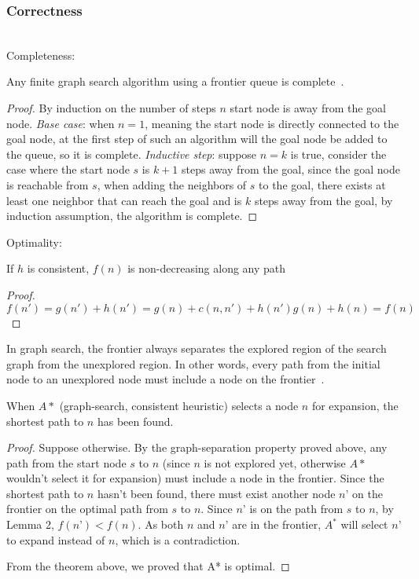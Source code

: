 \documentclass{llncs}
\begin{document}
\subsubsection{Correctness}\hfill\\
Completeness: 
\begin{lemma} 
Any finite graph search algorithm using a frontier queue is complete~\cite{ref_url1}.
\end{lemma} 
\begin{proof} 
By induction on the number of steps $n$ start node is away from the goal node. \emph{Base case}: when $n=1$, meaning the start node is directly connected to the goal node, at the first step of such an algorithm will the goal node be added to the queue, so it is complete. \emph{Inductive step}: suppose $n=k$ is true, consider the case where the start node $s$ is $k+1$ steps away from the goal, since the goal node is reachable from $s$, when adding the neighbors of $s$ to the goal, there exists at least one neighbor that can reach the goal and is $k$ steps away from the goal, by induction assumption, the algorithm is complete. 
\end{proof}
Optimality: 
\begin{lemma} 
If $h$ is consistent, $f(n)$ is non-decreasing along any path 
\end{lemma}
\begin{proof}
$f(n')=g(n')+h(n')=g(n)+c(n,n')+h(n')g(n)+h(n)=f(n)$ 
\end{proof}
\begin{lemma}  In graph search, the frontier always separates the explored region of the search graph from the unexplored region. In other words, every path from the initial node to an unexplored node must include a node on the frontier~\cite{ref_lncs1}. 
\end{lemma}
\begin{theorem} 
When $A*$ (graph-search, consistent heuristic) selects a node $n$ for expansion, the shortest path to $n$ has been found. 
\end{theorem}
\begin{proof}
Suppose otherwise. By the graph-separation property proved above, any path from the start node $s$ to $n$ (since $n$ is not explored yet, otherwise $A*$ wouldn’t select it for expansion) must include a node in the frontier. Since the shortest path to $n$ hasn’t been found, there must exist another node $n’$ on the frontier on the optimal path from $s$ to $n$. Since $n’$ is on the path from $s$ to $n$, by Lemma 2, $f(n’)<f(n)$. As both $n$ and $n’$ are in the frontier, $A^*$ will select $n’$ to expand instead of $n$, which is a contradiction.

From the theorem above, we proved that A* is optimal.
\end{proof}
\end{document}
